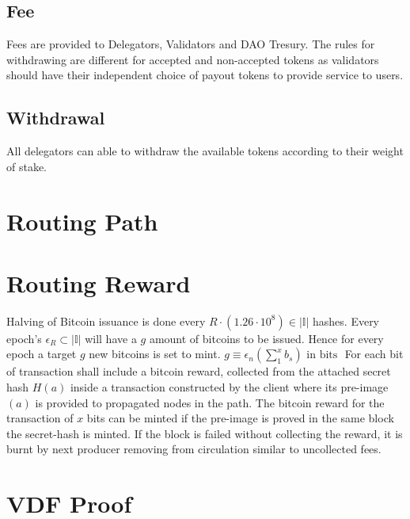 \documentclass[a4paper,10pt]{article}
\begin{document}
\subsection{Fee}
Fees are provided to Delegators, Validators and DAO Tresury. The rules for withdrawing are different for accepted and non-accepted tokens as validators should have their independent choice of payout tokens to provide service to users.
\subsection{Withdrawal}
All delegators can able to withdraw the available tokens according to their weight of stake.

\section{Routing Path}

\section{Routing Reward}
Halving of Bitcoin issuance is done every $R \cdot (1.26 \cdot 10^8) \in |\mathbb{I}|$ hashes. Every epoch's $ \epsilon_R \subset |\mathbb{I}|$ will have a $g$ amount of bitcoins to be issued. Hence for every epoch a target $g$ new bitcoins is set to mint. 
$g \equiv \epsilon_n(\sum_1^x b_s) \text{ in  bits }$ For each bit of transaction shall include a bitcoin reward, collected from the attached secret hash $H(a)$ inside a transaction constructed by the client where its pre-image $(a)$ is provided to propagated nodes in the path. The bitcoin reward for the transaction of $x$ bits can be minted if the pre-image is proved in the same block the secret-hash is minted. If the block is failed without collecting the reward, it is burnt by next producer removing from circulation similar to uncollected fees.
\section{VDF Proof}
\end{document}
